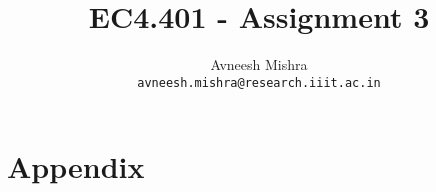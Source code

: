 

\title{EC4.401 - Assignment 3}
\author{
    Avneesh Mishra \\
    \texttt{avneesh.mishra@research.iiit.ac.in}
}


    \maketitle
    \tableofcontents
    \listoffigures
    \pagebreak
    
    \pagebreak
    
    \pagebreak
    
    \pagebreak
    \appendix
    \section{Appendix}
    

